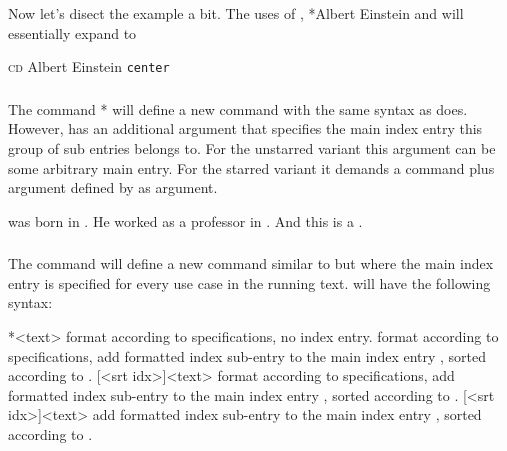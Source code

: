 \documentclass{cnpkgdoc}
\begin{document}
Now let's disect the example a bit. The uses of ,
*{Albert Einstein} and  will essentially expand
to
\begin{beispiel}
 \textsc{cd}
 \textsf{Albert Einstein}
 \texttt{center}
\end{beispiel}

\subsubsection{}\label{ssec:command:usage:newsubidxcmd}
The command *{}
will define a new command  with the same syntax as  does.
However,  has an additional argument that specifies the main
index entry this group of sub entries belongs to. For the unstarred variant this
argument can be some arbitrary main entry. For the starred variant it demands a
command plus argument defined by  as argument.

\begin{beispiel}
  was born in . He worked as a professor in .
 And this is a .
\end{beispiel}

\subsubsection{}\label{ssec:command:usage:newsubmainidxcmd}
The command  will define a
new command  similar to  but where the main index
entry is specified for every use case in the running text.  will have
the following syntax:
\begin{beschreibung}
 *{<text>}\newline
   format  according to specifications, no index entry.
 \newline
   format  according to specifications, add formatted index sub-entry
   to the main index entry , sorted according to .
 [<srt idx>]{<text>}\newline
   format  according to specifications, add formatted index sub-entry
   to the main index entry , sorted according to .
 [<srt idx>]{<text>}\newline
   add formatted index sub-entry to the main index entry ,
   sorted according to .
\end{beschreibung}
\end{document}
